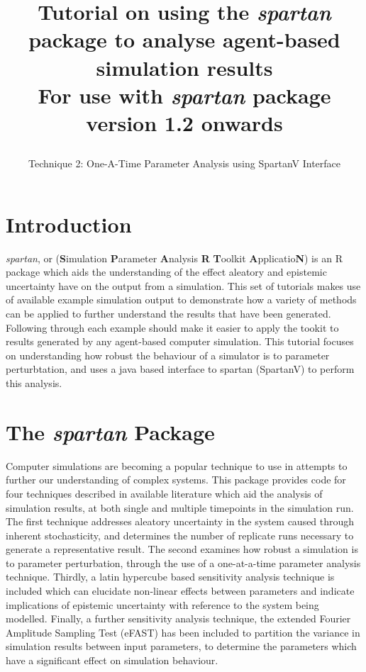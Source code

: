 \documentclass[a4paper,11pt]{article}
\title{\huge \textbf{Tutorial on using the \textit{spartan} package to analyse agent-based simulation results}\\
\Large For use with \textit{spartan} package version 1.2 onwards
\author{\Large Technique 2: One-A-Time Parameter Analysis using SpartanV Interface}
\date{}
}
\begin{document}
\maketitle


\section{Introduction}
\noindent \textit{spartan}, or (\textbf{S}imulation \textbf{P}arameter \textbf{A}nalysis \textbf{R} \textbf{T}oolkit \textbf{A}pplicatio\textbf{N}) is an R package which aids the understanding of the effect aleatory and epistemic uncertainty have on the output from a simulation. This set of tutorials makes use of available example simulation output to demonstrate how a variety of methods can be applied to further understand the results that have been generated.  Following through each example should make it easier to apply the tookit to results generated by any agent-based computer simulation.  This tutorial focuses on understanding how robust the behaviour of a simulator is to parameter perturbtation, and uses a java based interface to spartan (SpartanV) to perform this analysis.

\section{The \textit{spartan} Package}
\noindent Computer simulations are becoming a popular technique to use in attempts to further our understanding of complex systems. This package provides code for four techniques described in available literature which aid the analysis of simulation results, at both single and multiple timepoints in the simulation run. The first technique addresses aleatory uncertainty in the system caused through inherent stochasticity, and determines the number of replicate runs necessary to generate a representative result. The second examines how robust a simulation is to parameter perturbation, through the use of a one-at-a-time parameter analysis technique. Thirdly, a latin hypercube based sensitivity analysis technique is included which can elucidate non-linear effects between parameters and indicate implications of epistemic uncertainty with reference to the system being modelled. Finally, a further sensitivity analysis technique, the extended Fourier Amplitude Sampling Test (eFAST) has been included to partition the variance in simulation results between input parameters, to determine the parameters which have a significant effect on simulation behaviour.
\end{document}
